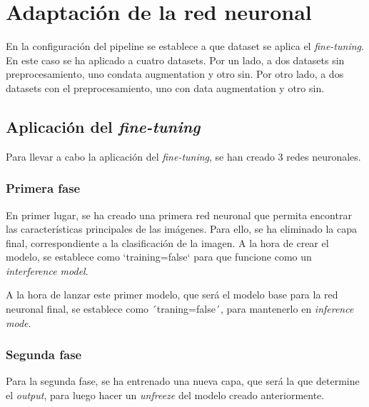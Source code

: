 \section{Adaptación de la red neuronal}

En la configuración del pipeline se establece a que dataset se aplica el \textit{fine-tuning}. En este caso se ha aplicado a cuatro datasets. 
Por un lado, a dos datasets sin preprocesamiento, uno condata augmentation y otro sin. Por otro lado, a dos datasets con el preprocesamiento, uno con data augmentation y otro sin. 

\subsection{Aplicación del \textit{fine-tuning}}


Para llevar a cabo la aplicación del \textit{fine-tuning}, se han creado 3 redes neuronales.

\subsubsection{Primera fase}


En primer lugar, se ha creado una primera red neuronal que permita encontrar las características principales de las imágenes.
Para ello, se ha eliminado la capa final, correspondiente a la clasificación de la imagen.
A la hora de crear el modelo, se establece como `training=false` para que funcione como un \textit{interference model}.

A la hora de lanzar este primer modelo, que será el modelo base para la red neuronal final, se establece como  ´traning=false´, para mantenerlo en \textit{inference mode}.


\subsubsection{Segunda fase}

Para la segunda fase, se ha entrenado una nueva capa, que será la que determine el \textit{output}, para luego hacer un \textit{unfreeze} del modelo creado anteriormente.

